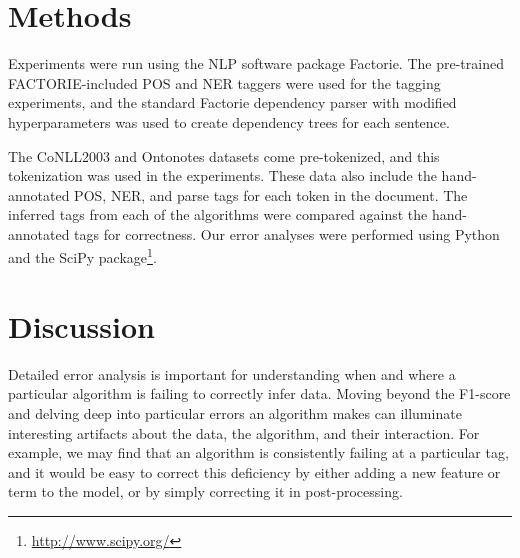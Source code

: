 \documentclass[12pt]{article}
\begin{document}
\section{Methods}
Experiments were run using the NLP software package Factorie. The pre-trained FACTORIE-included POS and NER taggers were used for the tagging experiments, and the standard Factorie dependency parser with modified hyperparameters was used to create dependency trees for each sentence.

The CoNLL2003 and Ontonotes datasets come pre-tokenized, and this tokenization was used in the experiments. These data also include the hand-annotated POS, NER, and parse tags for each token in the document. The inferred tags from each of the algorithms were compared against the hand-annotated tags for correctness. Our error analyses were performed using Python and the SciPy package\footnote{\protect\url{http://www.scipy.org/}}.

\section{Discussion}
Detailed error analysis is important for understanding when and where a particular algorithm is failing to correctly infer data. Moving beyond the F1-score and delving deep into particular errors an algorithm makes can illuminate interesting artifacts about the data, the algorithm, and their interaction. For example, we may find that an algorithm is consistently failing at a particular tag, and it would be easy to correct this deficiency by either adding a new feature or term to the model, or by simply correcting it in post-processing.
\end{document}
